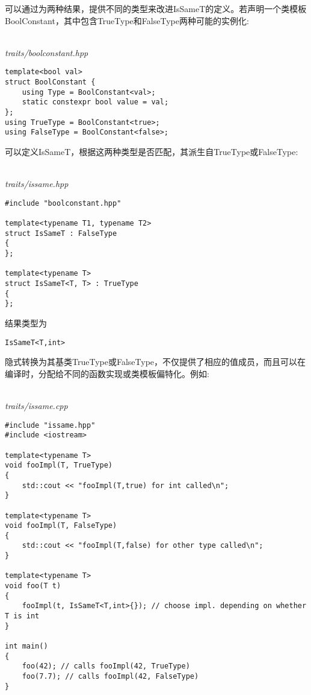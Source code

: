 可以通过为两种结果，提供不同的类型来改进IsSameT的定义。若声明一个类模板BoolConstant，其中包含TrueType和FalseType两种可能的实例化:

\hspace*{\fill} \\ %
\noindent
\textit{traits/boolconstant.hpp}
\begin{lstlisting}[style=styleCXX]
template<bool val>
struct BoolConstant {
	using Type = BoolConstant<val>;
	static constexpr bool value = val;
};
using TrueType = BoolConstant<true>;
using FalseType = BoolConstant<false>;
\end{lstlisting}

可以定义IsSameT，根据这两种类型是否匹配，其派生自TrueType或FalseType:

\hspace*{\fill} \\ %
\noindent
\textit{traits/issame.hpp}
\begin{lstlisting}[style=styleCXX]
#include "boolconstant.hpp"

template<typename T1, typename T2>
struct IsSameT : FalseType
{
};

template<typename T>
struct IsSameT<T, T> : TrueType
{
};
\end{lstlisting}

结果类型为

\begin{lstlisting}[style=styleCXX]
IsSameT<T,int>
\end{lstlisting}

隐式转换为其基类TrueType或FalseType，不仅提供了相应的值成员，而且可以在编译时，分配给不同的函数实现或类模板偏特化。例如:

\hspace*{\fill} \\ %
\noindent
\textit{traits/issame.cpp}
\begin{lstlisting}[style=styleCXX]
#include "issame.hpp"
#include <iostream>

template<typename T>
void fooImpl(T, TrueType)
{
	std::cout << "fooImpl(T,true) for int called\n";
}

template<typename T>
void fooImpl(T, FalseType)
{
	std::cout << "fooImpl(T,false) for other type called\n";
}

template<typename T>
void foo(T t)
{
	fooImpl(t, IsSameT<T,int>{}); // choose impl. depending on whether T is int
}

int main()
{
	foo(42); // calls fooImpl(42, TrueType)
	foo(7.7); // calls fooImpl(42, FalseType)
}
\end{lstlisting}

